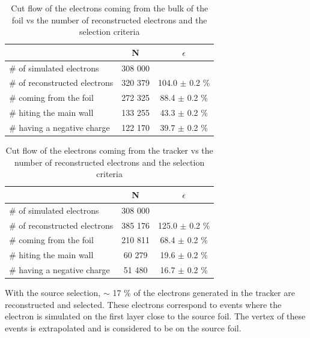 \documentclass[main.tex]{subfiles}
\begin{document}
\begin{table}[h!]
\begin{center}
\begin{tabular}{l|c|c}
 & N & $\epsilon$ \\
\toprule
$\#$ of simulated electrons & 308 000 & \\
\hline
$\#$ of reconstructed electrons & 320 379 & 104.0 $\pm$ 0.2 \% \\
$\#$ coming from the foil       & 272 325 & 88.4  $\pm$ 0.2 \% \\
$\#$ hiting the main wall       & 133 255 & 43.3  $\pm$ 0.2 \% \\
$\#$ having a negative charge   & 122 170 & 39.7  $\pm$ 0.2 \% \\
\bottomrule
\end{tabular}
\end{center}
\caption{Cut flow of the electrons coming from the bulk of the foil vs the number of reconstructed electrons and the selection criteria}
\label{Cutflowelectronbulk}
\end{table}


\begin{table}[h!]
\begin{center}
\begin{tabular}{l|c|c}
 & N & $\epsilon$ \\
\toprule
$\#$ of simulated electrons & 308 000 & \\
\hline
$\#$ of reconstructed electrons & 385 176 & 125.0 $\pm$ 0.2 \% \\
$\#$ coming from the foil       & 210 811 & 68.4  $\pm$ 0.2 \%\\
$\#$ hiting the main wall       & 60 279  & 19.6  $\pm$ 0.2 \%\\
$\#$ having a negative charge   & 51 480  & 16.7  $\pm$ 0.2 \%\\
\bottomrule
\end{tabular}
\end{center}
\caption{Cut flow of the electrons coming from the tracker vs the number of reconstructed electrons and the selection criteria}
\label{Cutflowelectrontrackercomingfromthesource}
\end{table}


\bigskip


\noindent With the source selection, $\sim$ 17 \% of the electrons generated in the tracker are reconstructed and selected. These electrons correspond to events where the electron is simulated on the first layer close to the source foil. The vertex of these events is extrapolated and is considered to be on the source foil.
\end{document}
